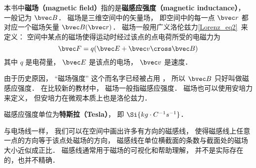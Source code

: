 
\begin{issues}
\issueDraft
\end{issues}


本书中\textbf{磁场（magnetic field）}指的是\textbf{磁感应强度（magnetic inductance）}， 一般记为 $\bvec B$． 磁场是三维空间中的矢量场， 即空间中的每一点 $\bvec r$ 都对应一个磁场矢量 $\bvec B(\bvec r)$． 磁场一般用广义洛伦兹力\autoref{Lorenz_eq2}~来定义： 空间中某点的磁场使得运动时经过该点的点电荷所受的电磁力为
\begin{equation}
\bvec F = q(\bvec E + \bvec v \cross \bvec B)
\end{equation}
其中 $q$ 是电荷量， $\bvec E$ 是该点的电场， $\bvec v$ 是速度．

由于历史原因， “磁场强度” 这个而名字已经被占用%
， 所以 $\bvec B$ 只好叫做磁感应强度． 在比较新的教材中， 磁场一般指磁感应强度． 磁场也可以使用安培力来定义， 但安培力在微观本质上也是洛伦兹力． 


磁感应强度单位为\textbf{特斯拉（Tesla）}， 即 $\Si{kg\cdot C^{-1}s^{-1}}$．

与电场线一样， 我们可以在空间中画出许多有方向的磁感线， 使得磁感线上任意一点的方向等于该点处磁场的方向， 磁感线在单位横截面的条数与截面处的磁场大小近似成正比． 磁感线通常用于磁场的可视化和帮助理解， 并不是实际存在的，也并不精确．

